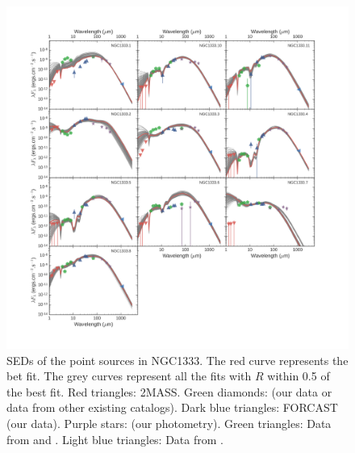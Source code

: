 \begin{figure}
\begin{center}
\hspace*{-1.5in}
\includegraphics[width=1.4\textwidth]{Figures/NGC1333_SEDs.png}
\caption[NGC1333 SEDs]{SEDs of the point sources in NGC1333. The red curve represents the bet fit. The grey curves represent all the fits with $R$ within 0.5 of the best fit. Red triangles: 2MASS. Green diamonds: \Spitzer (our data or data from other existing catalogs). Dark blue triangles: FORCAST (our data). Purple stars: \Herschel (our photometry). Green triangles: Data from \citep{vanKempen:2009ku} and \citep{vanKempen:2012fb}. Light blue triangles: Data from \citet{Enoch:2009ch}.}
\label{fig:NGC1333_SEDs}
\end{center}
\end{figure}

